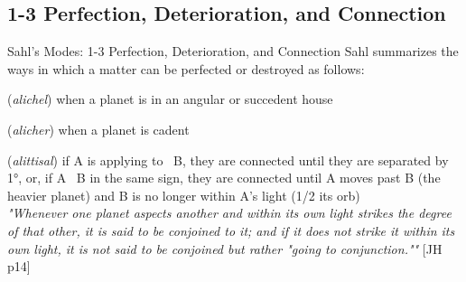 \subsection{1-3 Perfection, Deterioration, and Connection}
\begin{frame}[t]{Sahl's Modes: 1-3 Perfection, Deterioration, and Connection}
Sahl summarizes the ways in which a matter can be perfected or destroyed as follows:\footnotemark[1]

\begin{description}[style=nextline]
\item[1. Perfection or Advance] (\textsl{alichel}) when a planet is in an angular or succedent house

\item[2. Deterioration or Retreat] (\textsl{alicher}) when a planet is cadent

\item[3. Conjunction or Connection] (\textsl{alittisal}) if A is applying to \Conjunction\ B, they are connected until they are separated by 1°, or, if A \Conjunction\ B in the same sign, they are connected until A moves past B (the heavier planet) and B is no longer within A's light (1/2 its orb) \\
\vspace{1em}
\textsl{"Whenever one planet aspects another and within its own light strikes the degree of that other, it is said to be conjoined to it; and if it does not strike it within its own light, it is not said to be conjoined but rather "going to conjunction.""} [JH p14]\\

\end{description}

\end{frame}
